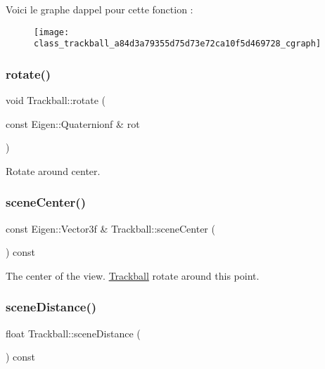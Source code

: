 Voici le graphe d\textquotesingle{}appel pour cette fonction \+:\nopagebreak
\begin{figure}[H]
\begin{center}
\leavevmode
\texttt{[image: class\_trackball\_a84d3a79355d75d73e72ca10f5d469728\_cgraph]}
\end{center}
\end{figure}
\mbox{\label{class_trackball_aa0dee57906be9ccd12183d0d6e820c3d}} 
\subsubsection{\texorpdfstring{rotate()}{rotate()}}
{\footnotesize\ttfamily void Trackball\+::rotate (\begin{DoxyParamCaption}\item[{const Eigen\+::\+Quaternionf \&}]{rot }\end{DoxyParamCaption})}



Rotate around {\ttfamily center}. 

\mbox{\label{class_trackball_ad658224ce2f6a47a1f607852c887654b}} 
\subsubsection{\texorpdfstring{scene\+Center()}{sceneCenter()}}
{\footnotesize\ttfamily const Eigen\+::\+Vector3f \& Trackball\+::scene\+Center (\begin{DoxyParamCaption}{ }\end{DoxyParamCaption}) const}



The center of the view. \hyperlink{class_trackball}{Trackball} rotate around this point. 

\mbox{\label{class_trackball_a9b40eb48561c425f30498a8a9f10ca1f}} 
\subsubsection{\texorpdfstring{scene\+Distance()}{sceneDistance()}}
{\footnotesize\ttfamily float Trackball\+::scene\+Distance (\begin{DoxyParamCaption}{ }\end{DoxyParamCaption}) const}



